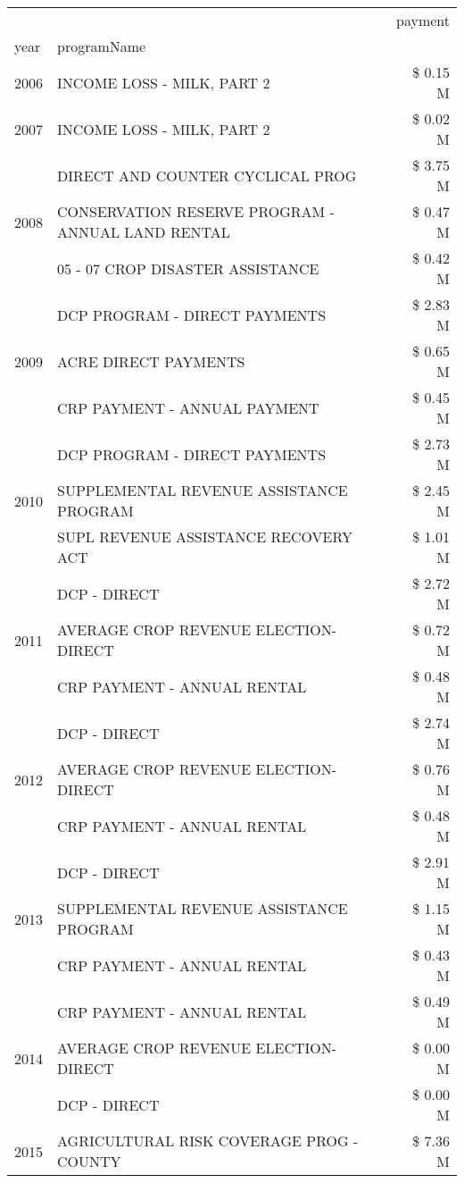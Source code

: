 \begin{tabular}{llr}
\toprule
 &  & payment \\
year & programName &  \\
\midrule
2006 & INCOME LOSS - MILK, PART 2 & \$ 0.15 M \\
\cline{1-3}
2007 & INCOME LOSS - MILK, PART 2 & \$ 0.02 M \\
\cline{1-3}
\multirow[t]{3}{*}{2008} & DIRECT AND COUNTER CYCLICAL PROG & \$ 3.75 M \\
 & CONSERVATION RESERVE PROGRAM - ANNUAL LAND RENTAL & \$ 0.47 M \\
 & 05 - 07 CROP DISASTER ASSISTANCE & \$ 0.42 M \\
\cline{1-3}
\multirow[t]{3}{*}{2009} & DCP PROGRAM - DIRECT PAYMENTS & \$ 2.83 M \\
 & ACRE DIRECT PAYMENTS & \$ 0.65 M \\
 & CRP PAYMENT - ANNUAL PAYMENT & \$ 0.45 M \\
\cline{1-3}
\multirow[t]{3}{*}{2010} & DCP PROGRAM - DIRECT PAYMENTS & \$ 2.73 M \\
 & SUPPLEMENTAL REVENUE ASSISTANCE PROGRAM & \$ 2.45 M \\
 & SUPL REVENUE ASSISTANCE RECOVERY ACT & \$ 1.01 M \\
\cline{1-3}
\multirow[t]{3}{*}{2011} & DCP - DIRECT & \$ 2.72 M \\
 & AVERAGE CROP REVENUE ELECTION-DIRECT & \$ 0.72 M \\
 & CRP PAYMENT - ANNUAL RENTAL & \$ 0.48 M \\
\cline{1-3}
\multirow[t]{3}{*}{2012} & DCP - DIRECT & \$ 2.74 M \\
 & AVERAGE CROP REVENUE ELECTION-DIRECT & \$ 0.76 M \\
 & CRP PAYMENT - ANNUAL RENTAL & \$ 0.48 M \\
\cline{1-3}
\multirow[t]{3}{*}{2013} & DCP - DIRECT & \$ 2.91 M \\
 & SUPPLEMENTAL REVENUE ASSISTANCE PROGRAM & \$ 1.15 M \\
 & CRP PAYMENT - ANNUAL RENTAL & \$ 0.43 M \\
\cline{1-3}
\multirow[t]{3}{*}{2014} & CRP PAYMENT - ANNUAL RENTAL & \$ 0.49 M \\
 & AVERAGE CROP REVENUE ELECTION-DIRECT & \$ 0.00 M \\
 & DCP - DIRECT & \$ 0.00 M \\
\cline{1-3}
\multirow[t]{2}{*}{2015} & AGRICULTURAL RISK COVERAGE PROG - COUNTY & \$ 7.36 M \\

\end{tabular}

